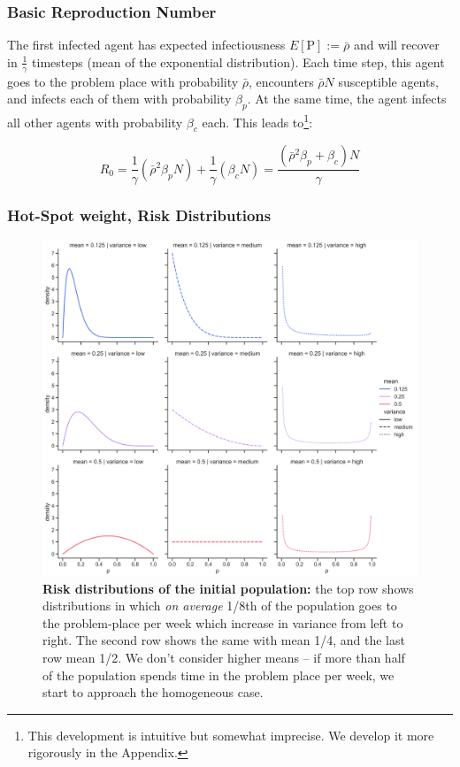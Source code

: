 \subsubsection{Basic Reproduction
Number}\label{basic-reproduction-number}

The first infected agent has expected infectiousness
\(E[\mathrm{P}] := \bar\rho\) and will recover in \(\frac{1}{\gamma}\)
timesteps (mean of the exponential distribution). Each time step, this
agent goes to the problem place with probability \(\bar\rho\),
encounters \(\bar\rho N\) susceptible agents, and infects each of them
with probability \(\beta_p\). At the same time, the agent infects all
other agents with probability \(\beta_c\) each. This leads
to\footnote{This development is intuitive but somewhat imprecise. We
  develop it more rigorously in the Appendix.}:

\[R_0 = \frac{1}{\gamma} (\bar\rho^2 \beta_p N)+ \frac{1}{\gamma} (\beta_c N)
        = \frac{(\bar\rho^2 \beta_p + \beta_c) N}{\gamma}\]

\subsubsection{Hot-Spot weight, Risk
Distributions}\label{hot-spot-weight-risk-distributions}

\begin{figure}
\centering
\includegraphics{images/risk_distributions.png}
\caption{\textbf{Risk distributions of the initial population:} the top
row shows distributions in which \textit{on average} 1/8th of the
population goes to the problem-place per week which increase in variance
from left to right. The second row shows the same with mean 1/4, and the
last row mean 1/2. We don't consider higher means -- if more than half
of the population spends time in the problem place per week, we start to
approach the homogeneous case.}
\end{figure}


